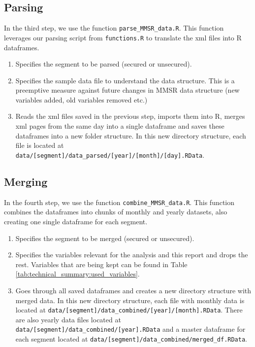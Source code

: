 \subsection{Parsing}
In the third step, we use the function \verb|parse_MMSR_data.R|. This function leverages our parsing script from \verb|functions.R| to translate the xml files into R dataframes.
\begin{enumerate}
	\item Specifies the segment to be parsed (secured or unsecured).
	\item Specifies the sample data file to understand the data structure. This is a preemptive measure against future changes in MMSR data structure (new variables added, old variables removed etc.)
	\item Reads the xml files saved in the previous step, imports them into R, merges xml pages from the same day into a single dataframe and saves these dataframes into a new folder structure. In this new directory structure, each file is located at \newline \verb|data/[segment]/data_parsed/[year]/[month]/[day].RData|.
\end{enumerate}

\subsection{Merging}
In the fourth step, we use the function \verb|combine_MMSR_data.R|. This function combines the dataframes into chunks of monthly and yearly datasets, also creating one single dataframe for each segment.
\begin{enumerate}
	\item Specifies the segment to be merged (secured or unsecured).
	\item Specifies the variables relevant for the analysis and this report and drops the rest. Variables that are being kept can be found in Table \ref{tab:technical_summary:used_variables}.
	\item Goes through all saved dataframes and creates a new directory structure with merged data. In this new directory structure, each file with monthly data is located at \newline \verb|data/[segment]/data_combined/[year]/[month].RData|. There are also yearly data files located at \verb|data/[segment]/data_combined/[year].RData| and a master dataframe for each segment located at \verb|data/[segment]/data_combined/merged_df.RData|.
\end{enumerate}




